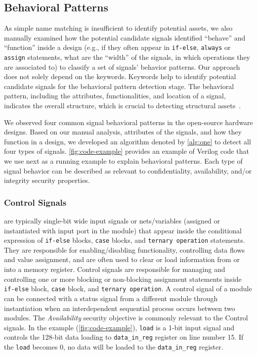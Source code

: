 \subsection{Behavioral Patterns\label{ssec:BP}}

As simple name matching is insufficient to identify potential assets, we also manually examined how the potential candidate signals identified ``behave'' and ``function'' inside a design (e.g., if they often appear in \texttt{if-else}, \texttt{always} or \texttt{assign} statements, what are the ``width'' of the signals, in which operations they are associated to) to classify a set of signals' behavior patterns. 
Our approach does not solely depend on the keywords. 
Keywords help to identify potential candidate signals for the behavioral pattern detection stage. The behavioral pattern, including the attributes, functionalities, and location of a signal, indicates the overall structure, which is crucial to detecting structural assets~\cite{ieee_p3164_working_group_asset_2024}.

We observed four common signal behavioral patterns in the open-source hardware designs. 
Based on our manual analysis, attributes of the signals, and how they function in a design, we developed an algorithm denoted by \autoref{alg:one} to detect all four types of signals. 
\autoref{fig:code-example} provides an example of Verilog code that we use next as a running example to explain behavioral patterns. 
Each type of signal behavior can be described as relevant to confidentiality, availability, and/or integrity security properties. 

\subsubsection{Control Signals} are typically single-bit wide input signals or nets/variables (assigned or instantiated with input port in the module) that appear inside the conditional expression of \texttt{if-else} blocks, \texttt{case} blocks, and \texttt{ternary operation} statements. 
They are responsible for enabling/disabling functionality, controlling data flows and value assignment, and are often used to clear or load information from or into a memory register. Control signals are responsible for managing and controlling one or more blocking or non-blocking assignment statements inside \texttt{if-else} block, \texttt{case} block, and \texttt{ternary operation}. 
A control signal of a module can be connected with a status signal from a different module through instantiation when an interdependent sequential process occurs between two modules.
The \textit{Availability} security objective is commonly relevant to the Control signals. 
In the example (\autoref{fig:code-example}), \texttt{load} is a 1-bit input signal and controls the 128-bit data loading to \texttt{data\_in\_reg} register on line number 15. If the \texttt{load} becomes 0, no data will be loaded to the \texttt{data\_in\_reg} register. 


